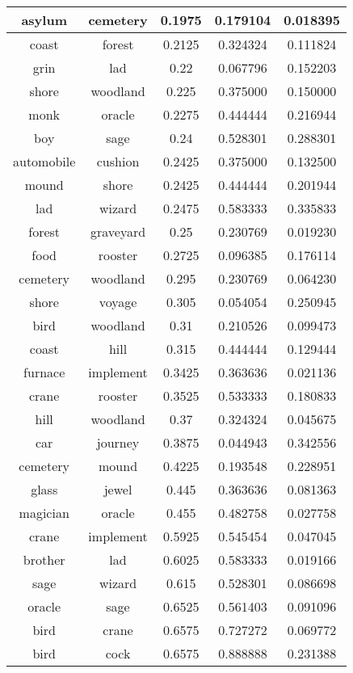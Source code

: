 \begin{center}
{\begin{longtable}{|c|c|c|c|c|}
\hline
asylum & cemetery & 0.1975 & 0.179104 & 0.018395 \\
\hline
coast & forest & 0.2125 & 0.324324 & 0.111824 \\
\hline
grin & lad & 0.22 & 0.067796 & 0.152203 \\
\hline
shore & woodland & 0.225 & 0.375000 & 0.150000 \\
\hline
monk & oracle & 0.2275 & 0.444444 & 0.216944 \\
\hline
boy & sage & 0.24 & 0.528301 & 0.288301 \\
\hline
automobile & cushion & 0.2425 & 0.375000 & 0.132500 \\
\hline
mound & shore & 0.2425 & 0.444444 & 0.201944 \\
\hline
lad & wizard & 0.2475 & 0.583333 & 0.335833 \\
\hline
forest & graveyard & 0.25 & 0.230769 & 0.019230 \\
\hline
food & rooster & 0.2725 & 0.096385 & 0.176114 \\
\hline
cemetery & woodland & 0.295 & 0.230769 & 0.064230 \\
\hline
shore & voyage & 0.305 & 0.054054 & 0.250945 \\
\hline
bird & woodland & 0.31 & 0.210526 & 0.099473 \\
\hline
coast & hill & 0.315 & 0.444444 & 0.129444 \\
\hline
furnace & implement & 0.3425 & 0.363636 & 0.021136 \\
\hline
crane & rooster & 0.3525 & 0.533333 & 0.180833 \\
\hline
hill & woodland & 0.37 & 0.324324 & 0.045675 \\
\hline
car & journey & 0.3875 & 0.044943 & 0.342556 \\
\hline
cemetery & mound & 0.4225 & 0.193548 & 0.228951 \\
\hline
glass & jewel & 0.445 & 0.363636 & 0.081363 \\
\hline
magician & oracle & 0.455 & 0.482758 & 0.027758 \\
\hline
crane & implement & 0.5925 & 0.545454 & 0.047045 \\
\hline
brother & lad & 0.6025 & 0.583333 & 0.019166 \\
\hline
sage & wizard & 0.615 & 0.528301 & 0.086698 \\
\hline
oracle & sage & 0.6525 & 0.561403 & 0.091096 \\
\hline
bird & crane & 0.6575 & 0.727272 & 0.069772 \\
\hline
bird & cock & 0.6575 & 0.888888 & 0.231388 \\

\end{longtable}}
\end{center}
